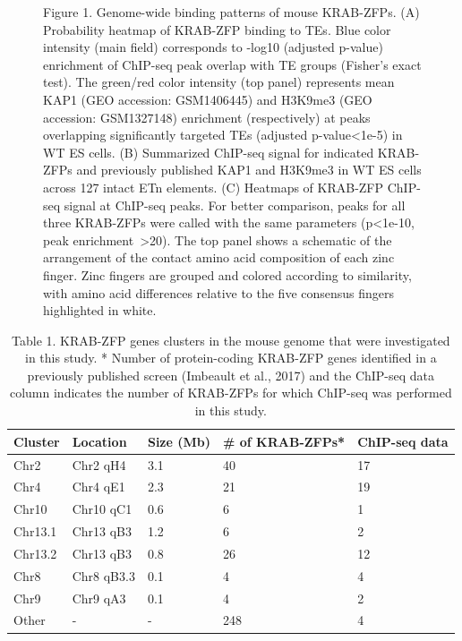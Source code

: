 \documentclass[11pt,a4paper]{article}
\begin{document}
\begin{figure}[h]
\caption{Figure 1. Genome-wide binding patterns of mouse KRAB-ZFPs. (A) Probability heatmap of KRAB-ZFP binding to TEs. Blue color intensity (main field) corresponds to -log10 (adjusted p-value) enrichment of ChIP-seq peak overlap with TE groups (Fisher’s exact test). The green/red color intensity (top panel) represents mean KAP1 (GEO accession: GSM1406445) and H3K9me3 (GEO accession: GSM1327148) enrichment (respectively) at peaks overlapping significantly targeted TEs (adjusted p-value<1e-5) in WT ES cells. (B) Summarized ChIP-seq signal for indicated KRAB-ZFPs and previously published KAP1 and H3K9me3 in WT ES cells across 127 intact ETn elements. (C) Heatmaps of KRAB-ZFP ChIP-seq signal at ChIP-seq peaks. For better comparison, peaks for all three KRAB-ZFPs were called with the same parameters (p<1e-10, peak enrichment >20). The top panel shows a schematic of the arrangement of the contact amino acid composition of each zinc finger. Zinc fingers are grouped and colored according to similarity, with amino acid differences relative to the five consensus fingers highlighted in white.}
\end{figure}

\begin{table}[h]
\caption{Table 1. KRAB-ZFP genes clusters in the mouse genome that were investigated in this study. * Number of protein-coding KRAB-ZFP genes identified in a previously published screen (Imbeault et al., 2017) and the ChIP-seq data column indicates the number of KRAB-ZFPs for which ChIP-seq was performed in this study.}
\begin{tabular}{|l|l|l|l|l|}
\hline
Cluster & Location & Size (Mb) & \# of KRAB-ZFPs* & ChIP-seq data \\ \hline
Chr2 & Chr2 qH4 & 3.1 & 40 & 17 \\ \hline
Chr4 & Chr4 qE1 & 2.3 & 21 & 19 \\ \hline
Chr10 & Chr10 qC1 & 0.6 & 6 & 1 \\ \hline
Chr13.1 & Chr13 qB3 & 1.2 & 6 & 2 \\ \hline
Chr13.2 & Chr13 qB3 & 0.8 & 26 & 12 \\ \hline
Chr8 & Chr8 qB3.3 & 0.1 & 4 & 4 \\ \hline
Chr9 & Chr9 qA3 & 0.1 & 4 & 2 \\ \hline
Other & - & - & 248 & 4 \\ \hline
\end{tabular}
\end{table}
\end{document}
